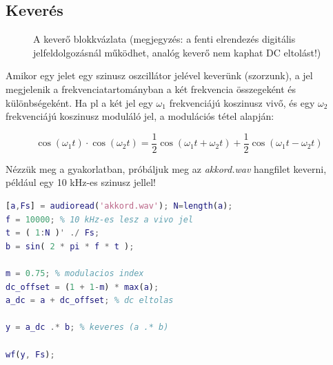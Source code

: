 \documentclass[12pt,a4paper]{article}
\begin{document}
\clearpage

\subsection{Keverés}


\begin{figure}[H]
\label{fig:keverok}
\centering
{}
\caption{
A keverő blokkvázlata (megjegyzés: a fenti elrendezés digitális jelfeldolgozásnál működhet, analóg keverő nem kaphat DC eltolást!)} 
\end{figure}

Amikor egy jelet egy szinusz oszcillátor jelével keverünk (szorzunk), a jel megjelenik a frekvenciatartományban a két frekvencia összegeként és különbségeként. Ha pl a két jel egy $\omega_1$ frekvenciájú koszinusz vivő, és egy $\omega_2$ frekvenciájú koszinusz moduláló jel, a modulációs tétel alapján:

\begin{equation}
\cos(\omega_1t) \cdot \cos(\omega_2t) = \frac{1}{2}\cos(\omega_1t+\omega_2t) +  \frac{1}{2}\cos(\omega_1t - \omega_2t)
\end{equation}

Nézzük meg a gyakorlatban, próbáljuk meg az \textit{akkord.wav} hangfilet keverni, például egy 10 kHz-es szinusz jellel!


\begin{lstlisting}[frame=single,language=matlab,caption=Keverés]
[a,Fs] = audioread('akkord.wav'); N=length(a);
f = 10000; % 10 kHz-es lesz a vivo jel
t = ( 1:N )' ./ Fs;
b = sin( 2 * pi * f * t );

m = 0.75; % modulacios index
dc_offset = (1 + 1-m) * max(a);
a_dc = a + dc_offset; % dc eltolas

y = a_dc .* b; % keveres (a .* b)

wf(y, Fs);
\end{lstlisting}
\end{document}
